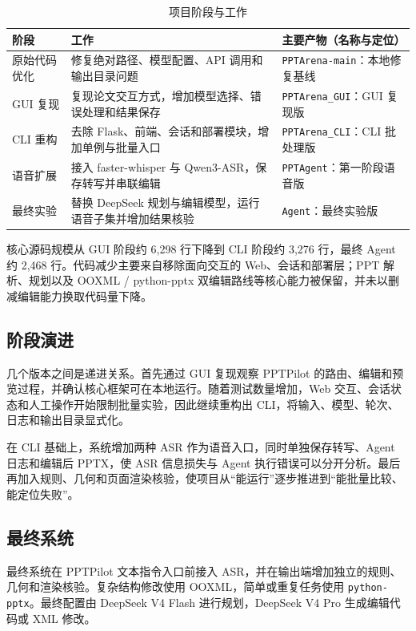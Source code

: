 \documentclass[11pt,a4paper,UTF8,fontset=fandol]{ctexart}
\begin{document}
\begin{table}[H]
\centering
\caption{项目阶段与工作}
\small
\begin{tabularx}{\textwidth}{L{2.5cm} Y Y}
\toprule
阶段 & 工作 & 主要产物（名称与定位） \\
\midrule
原始代码优化 & 修复绝对路径、模型配置、API 调用和输出目录问题 & \texttt{PPTArena-main}：本地修复基线 \\
GUI 复现 & 复现论文交互方式，增加模型选择、错误处理和结果保存 & \texttt{PPTArena\_GUI}：GUI 复现版 \\
CLI 重构 & 去除 Flask、前端、会话和部署模块，增加单例与批量入口 & \texttt{PPTArena\_CLI}：CLI 批处理版 \\
语音扩展 & 接入 faster-whisper 与 Qwen3-ASR，保存转写并串联编辑 & \texttt{PPTAgent}：第一阶段语音版 \\
最终实验 & 替换 DeepSeek 规划与编辑模型，运行语音子集并增加结果核验 & \texttt{Agent}：最终实验版 \\
\bottomrule
\end{tabularx}
\end{table}

核心源码规模从 GUI 阶段约 6,298 行下降到 CLI 阶段约 3,276 行，最终 Agent 约 2,468 行。代码减少主要来自移除面向交互的 Web、会话和部署层；PPT 解析、规划以及 OOXML / python-pptx 双编辑路线等核心能力被保留，并未以删减编辑能力换取代码量下降。

\subsection{阶段演进}

几个版本之间是递进关系。首先通过 GUI 复现观察 PPTPilot 的路由、编辑和预览过程，并确认核心框架可在本地运行。随着测试数量增加，Web 交互、会话状态和人工操作开始限制批量实验，因此继续重构出 CLI，将输入、模型、轮次、日志和输出目录显式化。

在 CLI 基础上，系统增加两种 ASR 作为语音入口，同时单独保存转写、Agent 日志和编辑后 PPTX，使 ASR 信息损失与 Agent 执行错误可以分开分析。最后再加入规则、几何和页面渲染核验，使项目从“能运行”逐步推进到“能批量比较、能定位失败”。

\subsection{最终系统}

最终系统在 PPTPilot 文本指令入口前接入 ASR，并在输出端增加独立的规则、几何和渲染核验。复杂结构修改使用 OOXML，简单或重复任务使用 \texttt{python-pptx}。最终配置由 DeepSeek V4 Flash 进行规划，DeepSeek V4 Pro 生成编辑代码或 XML 修改。
\end{document}
